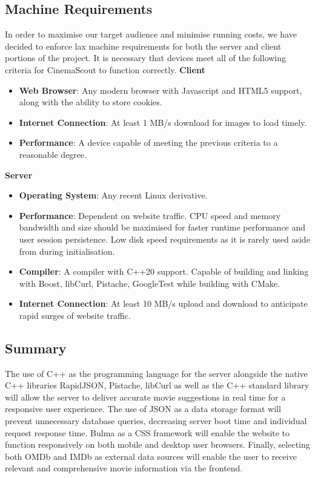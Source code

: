 \documentclass{article}
\begin{document}
\subsection{Machine Requirements}
In order to maximise our target audience and minimise running costs, we have 
decided to enforce lax machine requirements for both the server and client
portions of the project. It is necessary that devices meet all of the following
criteria for CinemaScout to function correctly.\newline\newline
\textbf{Client}
\begin{itemize}
\item \textbf{Web Browser}: Any modern browser with Javascript and HTML5
support, along with the ability to store cookies.
\item \textbf{Internet Connection}: At least 1 MB/s download for images to load 
timely.
\item \textbf{Performance}: A device capable of meeting the previous criteria
to a reasonable degree.
\end{itemize}
\textbf{Server}
\begin{itemize}
\item \textbf{Operating System}: Any recent Linux derivative.
\item \textbf{Performance}: Dependent on website traffic. CPU speed and memory
bandwidth and size should be maximised for faster runtime performance and user
session persistence. Low disk speed requirements as it is rarely used aside
from during initialisation.
\item \textbf{Compiler}: A compiler with C++20 support. Capable of building and
linking with Boost, libCurl, Pistache, GoogleTest while building with CMake.
\item \textbf{Internet Connection}: At least 10 MB/s upload and download to 
anticipate rapid surges of website traffic.
\end{itemize}
\subsection{Summary}
The use of C++ as the programming language for the server alongside the native
C++ libraries  RapidJSON, Pistache, libCurl as well as the C++ standard library
will allow the server to deliver accurate movie suggestions in real time for a
responsive user experience. The use of JSON as a data storage format will 
prevent unnecessary database queries, decreasing server boot time and
individual request response time.
\newline\newline
Bulma as a CSS framework will enable the website to
function responsively on both mobile and desktop user browsers. Finally,
selecting both OMDb and IMDb as external data sources will enable the user
to receive relevant and comprehensive movie information via the frontend.
\end{document}
